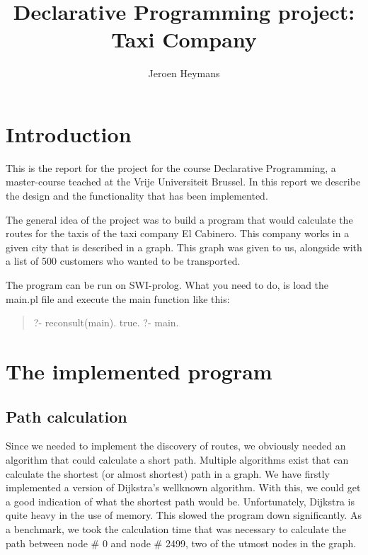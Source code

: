 \documentclass[10pt,a4paper]{article}
\author{Jeroen Heymans}
\title{Declarative Programming project: Taxi Company}
\begin{document}
\maketitle
\tableofcontents

\section{Introduction}
This is the report for the project for the course Declarative Programming, a master-course teached at the Vrije Universiteit Brussel. In this report we describe the design and the functionality that has been implemented.

The general idea of the project was to build a program that would calculate the routes for the taxis of the taxi company El Cabinero. This company works in a given city that is described in a graph. This graph was given to us, alongside with a list of 500 customers who wanted to be transported.

The program can be run on SWI-prolog. What you need to do, is load the main.pl file and execute the main function like this:

\begin{quote}
\begin{flushleft}
?- reconsult(main).\linebreak
true.\linebreak
?- main.
\end{flushleft}
\end{quote}

\section{The implemented program}

\subsection{Path calculation}

Since we needed to implement the discovery of routes, we obviously needed an algorithm that could calculate a short path. Multiple algorithms exist that can calculate the shortest (or almost shortest) path in a graph. We have firstly implemented a version of Dijkstra's wellknown algorithm. With this, we could get a good indication of what the shortest path would be. Unfortunately, Dijkstra is quite heavy in the use of memory. This slowed the program down significantly. As a benchmark, we took the calculation time that was necessary to calculate the path between node \# 0 and node \# 2499, two of the utmost nodes in the graph.
\end{document}
